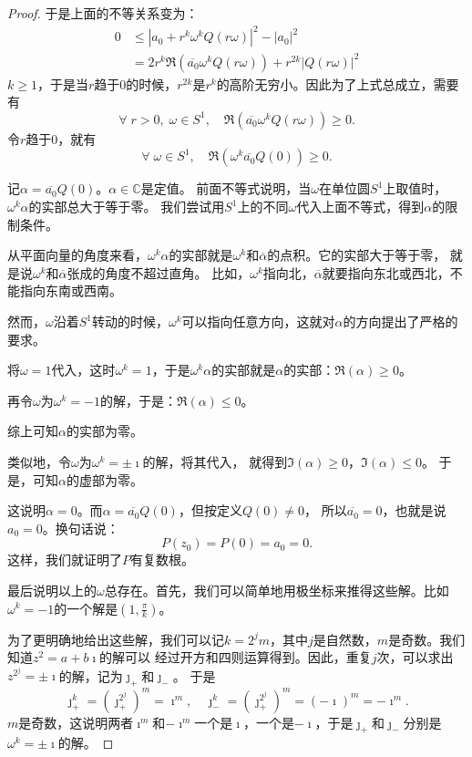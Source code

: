 \documentclass[12pt,UTF8,fontset=none]{ctexbook}
\begin{document}
\begin{appendix}
\begin{proof}
    于是上面的不等关系变为：
    \begin{align*}
        0 &\leqslant |a_0 + r^k \omega^k Q(r\omega)|^2 - |a_0|^2 \\
          &= 2r^k \Re(\overline{a_0} \omega^k Q(r\omega)) + r^{2k}|Q(r\omega)|^2 
    \end{align*}
    $k\geqslant 1$，于是当$r$趋于$0$的时候，$r^{2k}$是$r^k$的高阶无穷小。因此为了上式总成立，需要有
    $$ \forall \; r > 0,\; \omega \in S^1,\quad \Re(\overline{a_0} \omega^k Q(r\omega)) \geqslant 0. $$
    令$r$趋于$0$，就有
    $$ \forall \; \omega \in S^1,\quad \Re(\omega^k\overline{a_0} Q(0)) \geqslant 0. $$

    记$\alpha = \overline{a_0} Q(0)$。$\alpha \in\mathbb{C}$是定值。
    前面不等式说明，当$\omega$在单位圆$S^1$上取值时，$\omega^k \alpha$的实部总大于等于零。
    我们尝试用$S^1$上的不同$\omega$代入上面不等式，得到$\alpha$的限制条件。

    从平面向量的角度来看，$\omega^k \alpha$的实部就是$\omega^k$和$\overline{\alpha}$的点积。它的实部大于等于零，
    就是说$\omega^k$和$\overline{\alpha}$张成的角度不超过直角。
    比如，$\omega^k$指向北，$\overline{\alpha}$就要指向东北或西北，不能指向东南或西南。

    然而，$\omega$沿着$S^1$转动的时候，$\omega^k$可以指向任意方向，这就对$\alpha$的方向提出了严格的要求。

    将$\omega = 1$代入，这时$\omega^k = 1$，于是$\omega^k \alpha$的实部就是$\alpha$的实部：$\Re(\alpha) \geqslant 0$。

    再令$\omega$为$\omega^k = -1$的解，于是：$\Re(\alpha) \leqslant 0$。%

    综上可知$\alpha$的实部为零。

    类似地，令$\omega$为$\omega^k = \pm \imath$的解，将其代入，%
    就得到$\Im(\alpha) \geqslant 0$，$\Im(\alpha) \leqslant 0$。
    于是，可知$\alpha$的虚部为零。

    这说明$\alpha = 0$。而$\alpha = \overline{a_0} Q(0)$，但按定义$Q(0)\neq 0$，
    所以$\overline{a_0} = 0$，也就是说$a_0 = 0$。换句话说：
    $$ P(z_0) = P(0) = a_0 = 0. $$
    这样，我们就证明了$P$有复数根。

    最后说明以上的$\omega$总存在。首先，我们可以简单地用极坐标来推得这些解。比如$\omega^k = -1$的一个解是$\left(1, \frac{\pi}{k}\right)$。
    
    为了更明确地给出这些解，我们可以记$k = 2^j m$，其中$j$是自然数，$m$是奇数。我们知道$z^2 = a + b\imath$的解可以
    经过开方和四则运算得到。因此，重复$j$次，可以求出$z^{2^j} = \pm \imath$的解，记为$\jmath_+$和$\jmath_-$。
    于是
    $$\jmath_+^k = \left(\jmath_+^{2^j}\right)^m = \imath^m, \quad \jmath_-^k = \left(\jmath_+^{2^j}\right)^m = (-\imath)^m = -\imath^m.$$
    $m$是奇数，这说明两者$\imath^m$和$-\imath^m$一个是$\imath$，一个是$-\imath$，于是$\jmath_+$和$\jmath_-$分别是$\omega^k = \pm \imath$的解。


\end{proof}
\end{appendix}
\end{document}
